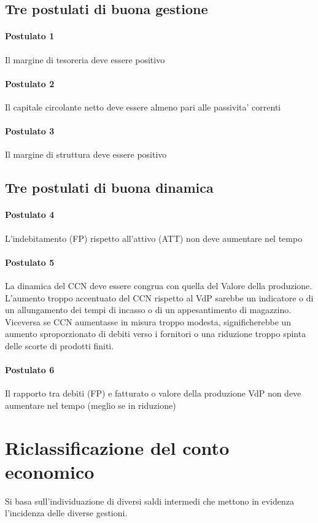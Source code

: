 \documentclass{report}
\begin{document}
	\subsection{Tre postulati di buona gestione}
	\paragraph{Postulato 1} Il margine di tesoreria deve essere positivo
	\paragraph{Postulato 2} Il capitale circolante netto deve essere almeno pari alle passivita' correnti
	\paragraph{Postulato 3} Il margine di struttura deve essere positivo
	\subsection{Tre postulati di buona dinamica}
	\paragraph{Postulato 4} L'indebitamento (FP) rispetto all'attivo (ATT) non deve aumentare nel tempo
	\paragraph{Postulato 5} La dinamica del CCN deve essere congrua con quella del Valore della produzione. L’aumento troppo accentuato del CCN rispetto al VdP sarebbe un indicatore o di un allungamento dei tempi di incasso o di un appesantimento di magazzino. Viceversa se CCN aumentasse in misura troppo modesta, significherebbe un aumento sproporzionato di debiti verso i fornitori o una riduzione troppo spinta delle scorte di prodotti finiti.
	\paragraph{Postulato 6} Il rapporto tra debiti (FP) e fatturato o valore della produzione VdP non deve aumentare nel tempo (meglio se in riduzione)
	
	\section{Riclassificazione del conto economico}
	Si basa sull'individuazione di diversi saldi intermedi che mettono in evidenza l'incidenza delle diverse gestioni.
\end{document}
